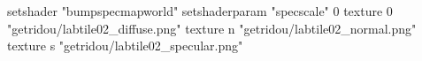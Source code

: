 setshader "bumpspecmapworld"
setshaderparam "specscale" 0
   texture 0 "getridou/labtile02_diffuse.png"
   texture n "getridou/labtile02_normal.png"
   texture s "getridou/labtile02_specular.png"

